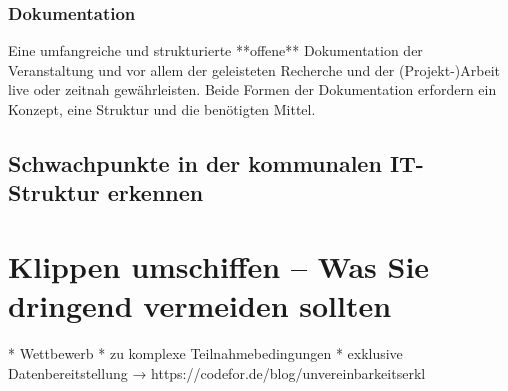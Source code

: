 \subsection{Dokumentation}
Eine umfangreiche und strukturierte **offene** Dokumentation der Veranstaltung und vor allem der geleisteten Recherche und der (Projekt-)Arbeit live oder zeitnah gewährleisten. Beide Formen der Dokumentation erfordern ein Konzept, eine Struktur und die benötigten Mittel.

\section{Schwachpunkte in der kommunalen IT-Struktur erkennen}


\chapter{Klippen umschiffen – Was Sie dringend vermeiden sollten}

* Wettbewerb
* zu komplexe Teilnahmebedingungen
* exklusive Datenbereitstellung → https://codefor.de/blog/unvereinbarkeitserkl%






